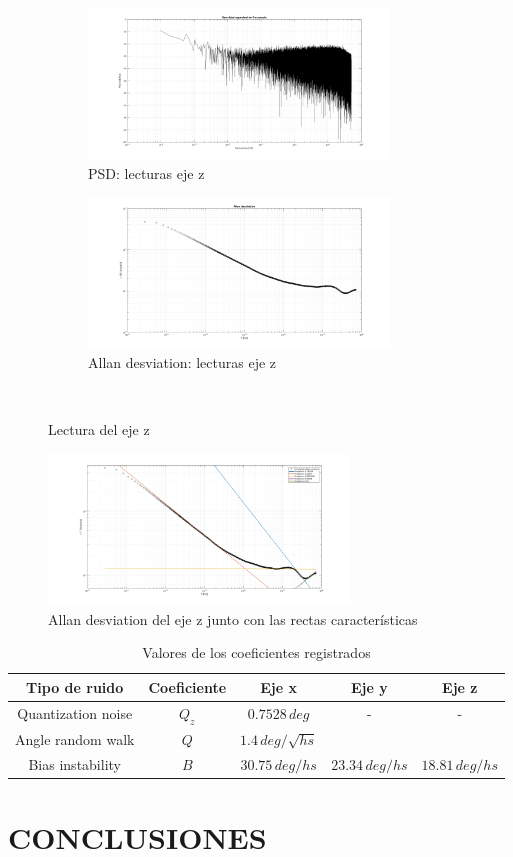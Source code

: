 \documentclass[a4paper,11pt,twoside]{IT-CNEA}
\begin{document}
\begin{figure}[t!]
    \centering
    \begin{subfigure}[t]{0.5\textwidth}
        \centering
        \includegraphics[width=8cm]{Figuras/PSDGyroz.png}
        \caption{PSD: lecturas eje z}
        \label{fig:}
    \end{subfigure}%
    \begin{subfigure}[t]{0.5\textwidth}
        \centering
        \includegraphics[width=8cm]{Figuras/AllanGyroz.png}
        \caption{Allan desviation: lecturas eje z}
        \label{fig:}
    \end{subfigure}%
    ~ 
    \caption{Lectura del eje z}
    \label{fig:lecturasEjez}
\end{figure}
\begin{figure}[h!]
\centering
\includegraphics[width=8cm]{Figuras/AllanGyrozRectas.png}
\caption{Allan desviation del eje z junto con las rectas características}
\label{fig:lecturaEjezRectas}
\end{figure}
\begin{table}[h!]
\centering
\caption{Valores de los coeficientes registrados}
\label{tabla:valoresCoeficientesEjes}
\begin{tabular}{|c|c|c|c|c|}
\hline
Tipo de ruido&Coeficiente& Eje x & Eje y & Eje z \\ \hline
Quantization noise&$Q_z$&$0.7528\,deg$&-&- \\ \hline
Angle random walk&$Q$&$1.4\,deg/\sqrt{hs}$& & \\ \hline
Bias instability&$B$&$30.75\,deg/hs$ &$23.34\,deg/hs$ &$18.81\,deg/hs$\\ \hline
\end{tabular}
\end{table}
\section{CONCLUSIONES}
\newpage


\end{document}
